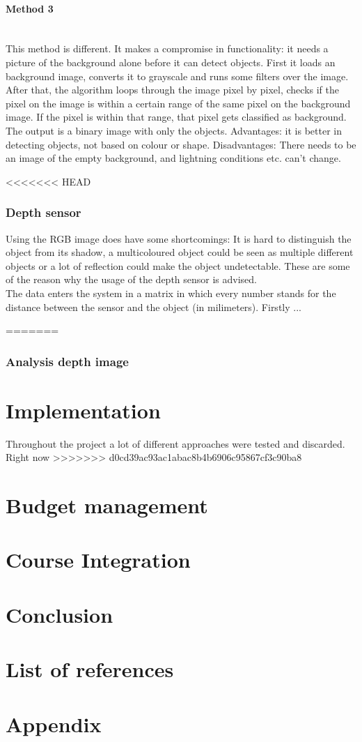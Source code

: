 \documentclass[11pt]{article}
\begin{document}
\paragraph{Method 3}\mbox{}\\
This method is different. It makes a compromise in functionality: it needs a picture of the background alone before it can detect objects. First it loads an background image, converts it to grayscale and runs some filters over the image. After that, the algorithm loops through the image pixel by pixel, checks if the pixel on the image is within a certain range of the same pixel on the background image. If the pixel is within that range, that pixel gets classified as background. The output is a binary image with only the objects.  
Advantages: it is better in detecting objects, not based on colour or shape.
Disadvantages: There needs to be an image of the empty background, and lightning conditions etc. can’t change.

\newpage

<<<<<<< HEAD
\subsubsection{Depth sensor}
Using the RGB image does have some shortcomings: It is hard to distinguish the object from its shadow, a multicoloured object could be seen as multiple different objects or a lot of reflection could make the object undetectable. These are some of the reason why the usage of the depth sensor is advised.
\\

The data enters the system in a matrix in which every number stands for the distance between the sensor and the object (in milimeters). Firstly ...  

     

=======
\subsubsection{Analysis depth image}

\section{Implementation}
Throughout the project a lot of different approaches were tested and discarded. Right now 
>>>>>>> d0cd39ac93ac1abac8b4b6906c95867cf3c90ba8

\section{Budget management}

\section{Course Integration}

\section{Conclusion}

\section{List of references}

\section{Appendix}
\end{document}
